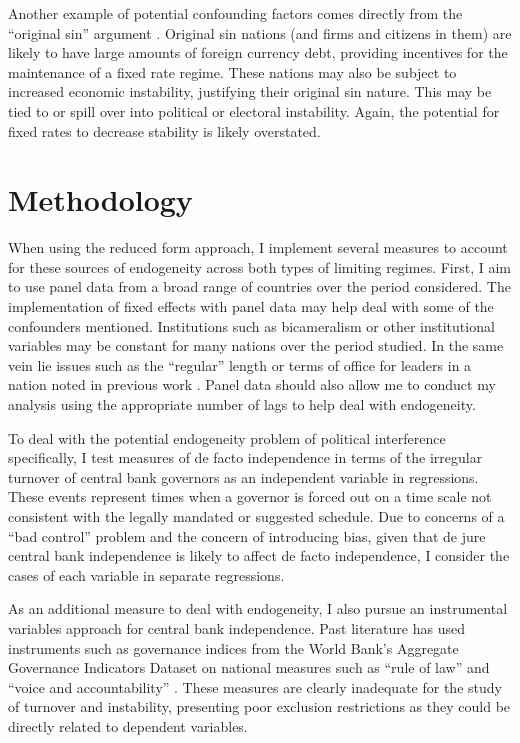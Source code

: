 \documentclass{article}
\begin{document}
    Another example of potential confounding factors comes directly from the “original sin” argument \citep{eichengreen_other_2005}. Original sin nations (and firms and citizens in them) are likely to have large amounts of foreign currency debt, providing incentives for the maintenance of a fixed rate regime. These nations may also be subject to increased economic instability, justifying their original sin nature. This may be tied to or spill over into political or electoral instability. Again, the potential for fixed rates to decrease stability is likely overstated.
    
    \section*{Methodology}

    When using the reduced form approach, I implement several measures to account for these sources of endogeneity across both types of limiting regimes. First, I aim to use panel data from a broad range of countries over the period considered. The implementation of fixed effects with panel data may help deal with some of the confounders mentioned. Institutions such as bicameralism or other institutional variables may be constant for many nations over the period studied. In the same vein lie issues such as the “regular” length or terms of office for leaders in a nation noted in previous work \citep{bernhard_political_2002-1}. Panel data should also allow me to conduct my analysis using the appropriate number of lags to help deal with endogeneity.

    To deal with the potential endogeneity problem of political interference specifically, I test measures of de facto independence in terms of the irregular turnover of central bank governors as an independent variable in regressions. These events represent times when a governor is forced out on a time scale not consistent with the legally mandated or suggested schedule. Due to concerns of a “bad control” problem and the concern of introducing bias, given that de jure central bank independence is likely to affect de facto independence, I consider the cases of each variable in separate regressions.

    As an additional measure to deal with endogeneity, I also pursue an instrumental variables approach for central bank independence. Past literature has used instruments such as governance indices from the World Bank’s Aggregate Governance Indicators Dataset on national measures such as “rule of law” and “voice and accountability” \citep{crowe_central_2008}. These measures are clearly inadequate for the study of turnover and instability, presenting poor exclusion restrictions as they could be directly related to dependent variables.
\end{document}
